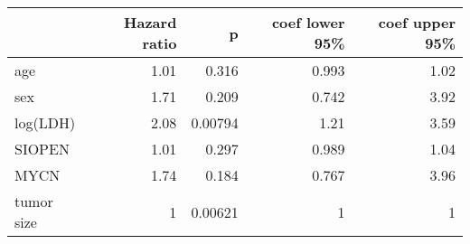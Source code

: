 \begin{tabular}{lrrrr}
\toprule
{} &  Hazard ratio &       p &  coef lower 95\% &  coef upper 95\% \\
\midrule
age        &          1.01 &   0.316 &            0.993 &             1.02 \\
sex        &          1.71 &   0.209 &            0.742 &             3.92 \\
log(LDH)   &          2.08 & 0.00794 &             1.21 &             3.59 \\
SIOPEN     &          1.01 &   0.297 &            0.989 &             1.04 \\
MYCN       &          1.74 &   0.184 &            0.767 &             3.96 \\
tumor size &             1 & 0.00621 &                1 &                1 \\
\bottomrule
\end{tabular}
